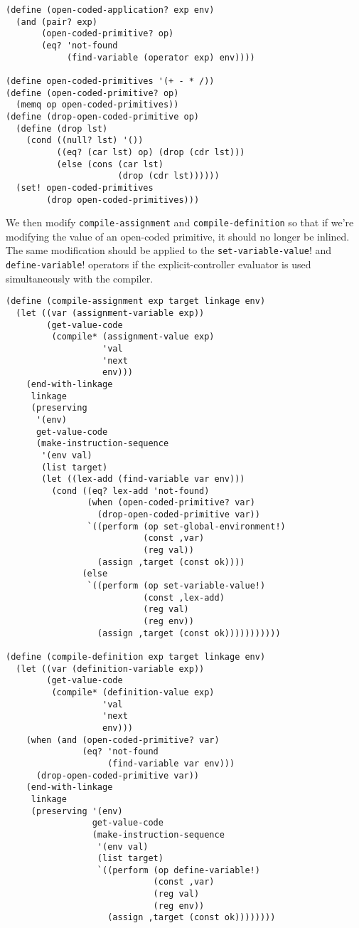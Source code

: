 \documentclass[a4paper,12pt]{article}
\begin{document}
\begin{lstlisting}
(define (open-coded-application? exp env)
  (and (pair? exp)
       (open-coded-primitive? op)
       (eq? 'not-found
            (find-variable (operator exp) env))))

(define open-coded-primitives '(+ - * /))
(define (open-coded-primitive? op)
  (memq op open-coded-primitives))
(define (drop-open-coded-primitive op)
  (define (drop lst)
    (cond ((null? lst) '())
          ((eq? (car lst) op) (drop (cdr lst)))
          (else (cons (car lst)
                      (drop (cdr lst))))))
  (set! open-coded-primitives
        (drop open-coded-primitives)))
\end{lstlisting}

We then modify \lstinline!compile-assignment! and
\lstinline!compile-definition!  so that if we're modifying the value
of an open-coded primitive, it should no longer be inlined.  The
same modification should be applied to the
\lstinline!set-variable-value!! and \lstinline!define-variable!!
operators if the explicit-controller evaluator is used simultaneously
with the compiler.

\begin{lstlisting}
(define (compile-assignment exp target linkage env)
  (let ((var (assignment-variable exp))
        (get-value-code
         (compile* (assignment-value exp)
                   'val
                   'next
                   env)))
    (end-with-linkage
     linkage
     (preserving
      '(env)
      get-value-code
      (make-instruction-sequence
       '(env val)
       (list target)
       (let ((lex-add (find-variable var env)))
         (cond ((eq? lex-add 'not-found)
                (when (open-coded-primitive? var)
                  (drop-open-coded-primitive var))
                `((perform (op set-global-environment!)
                           (const ,var)
                           (reg val))
                  (assign ,target (const ok))))
               (else
                `((perform (op set-variable-value!)
                           (const ,lex-add)
                           (reg val)
                           (reg env))
                  (assign ,target (const ok)))))))))))

(define (compile-definition exp target linkage env)
  (let ((var (definition-variable exp))
        (get-value-code
         (compile* (definition-value exp)
                   'val
                   'next
                   env)))
    (when (and (open-coded-primitive? var)
               (eq? 'not-found
                    (find-variable var env)))
      (drop-open-coded-primitive var))
    (end-with-linkage
     linkage
     (preserving '(env)
                 get-value-code
                 (make-instruction-sequence
                  '(env val)
                  (list target)
                  `((perform (op define-variable!)
                             (const ,var)
                             (reg val)
                             (reg env))
                    (assign ,target (const ok))))))))
\end{lstlisting}
\end{document}
